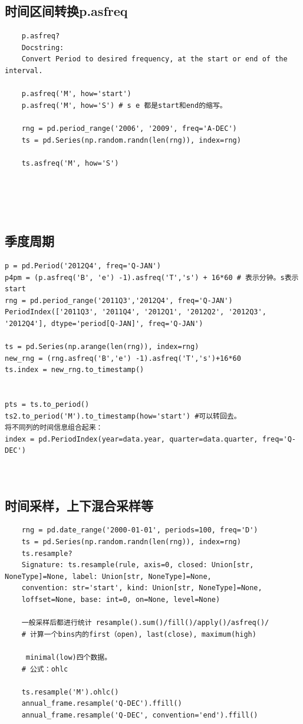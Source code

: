 \documentclass{article}
\begin{document}
\subsection{时间区间转换p.asfreq}
\begin{lstlisting}
	p.asfreq?
	Docstring:
	Convert Period to desired frequency, at the start or end of the interval.
	
	p.asfreq('M', how='start')
	p.asfreq('M', how='S') # s e 都是start和end的缩写。
	
	rng = pd.period_range('2006', '2009', freq='A-DEC')
	ts = pd.Series(np.random.randn(len(rng)), index=rng)
	
	ts.asfreq('M', how='S')
	

	
	
\end{lstlisting}

\subsection{季度周期}
\begin{lstlisting}
p = pd.Period('2012Q4', freq='Q-JAN')
p4pm = (p.asfreq('B', 'e') -1).asfreq('T','s') + 16*60 # 表示分钟。s表示start 
rng = pd.period_range('2011Q3','2012Q4', freq='Q-JAN')
PeriodIndex(['2011Q3', '2011Q4', '2012Q1', '2012Q2', '2012Q3', '2012Q4'], dtype='period[Q-JAN]', freq='Q-JAN')

ts = pd.Series(np.arange(len(rng)), index=rng)
new_rng = (rng.asfreq('B','e') -1).asfreq('T','s')+16*60
ts.index = new_rng.to_timestamp()


pts = ts.to_period()
ts2.to_period('M').to_timestamp(how='start') #可以转回去。
将不同列的时间信息组合起来：
index = pd.PeriodIndex(year=data.year, quarter=data.quarter, freq='Q-DEC')



\end{lstlisting}
\subsection{时间采样，上下混合采样等}
\begin{lstlisting}
	rng = pd.date_range('2000-01-01', periods=100, freq='D')
	ts = pd.Series(np.random.randn(len(rng)), index=rng)
	ts.resample?
	Signature: ts.resample(rule, axis=0, closed: Union[str, NoneType]=None, label: Union[str, NoneType]=None, 
	convention: str='start', kind: Union[str, NoneType]=None, 
	loffset=None, base: int=0, on=None, level=None)
	
	一般采样后都进行统计 resample().sum()/fill()/apply()/asfreq()/
	# 计算一个bins内的first（open), last(close), maximum(high)
	
	 minimal(low)四个数据。
	# 公式：ohlc 
	
	ts.resample('M').ohlc()
	annual_frame.resample('Q-DEC').ffill() 
	annual_frame.resample('Q-DEC', convention='end').ffill()
	
	
	
\end{lstlisting}
\end{document}
